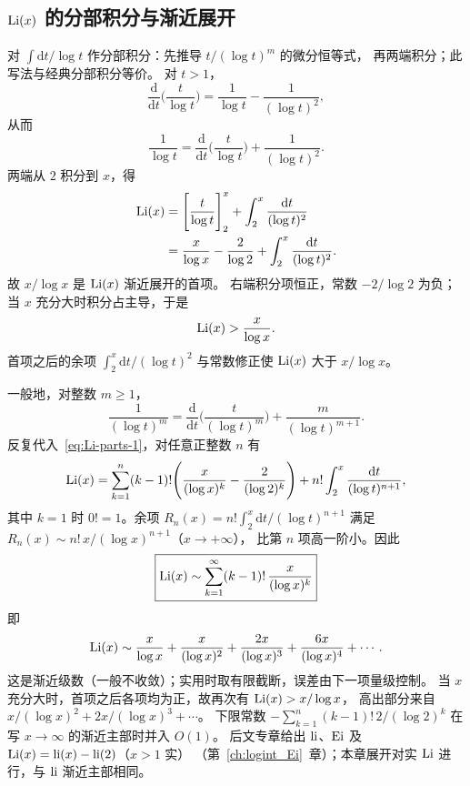 \subsection{\texorpdfstring{$\operatorname{Li}(x)$}{Li(x)} 的分部积分与渐近展开}
\label{sec:Li-integration-by-parts}

对 $\int\mathrm{d}t/\log t$ 作分部积分：先推导 $t/(\log t)^{m}$ 的微分恒等式，
再两端积分；此写法与经典分部积分等价。
对 $t>1$，
\[
  \frac{\mathrm{d}}{\mathrm{d}t}\Biggl(\frac{t}{\log t}\Biggr)
  =\frac{1}{\log t}-\frac{1}{(\log t)^{2}},
\]
从而
\[
  \frac{1}{\log t}
  =\frac{\mathrm{d}}{\mathrm{d}t}\Biggl(\frac{t}{\log t}\Biggr)
  +\frac{1}{(\log t)^{2}}.
\]
两端从 $2$ 积分到 $x$，得
\begin{align}
  \operatorname{Li}(x)
  &=\Biggl[\frac{t}{\log t}\Biggr]_{2}^{x}
  +\int_{2}^{x}\frac{\mathrm{d}t}{(\log t)^{2}}
  \nonumber\\
  &=\frac{x}{\log x}-\frac{2}{\log 2}
  +\int_{2}^{x}\frac{\mathrm{d}t}{(\log t)^{2}}.
  \label{eq:Li-parts-1}
\end{align}
故 $x/\log x$ 是 $\operatorname{Li}(x)$ 渐近展开的首项。
右端积分项恒正，常数 $-2/\log 2$ 为负；当 $x$ 充分大时积分占主导，于是
\[
  \operatorname{Li}(x) > \frac{x}{\log x}.
\]
首项之后的余项 $\int_2^x\mathrm{d}t/(\log t)^2$ 与常数修正使 $\operatorname{Li}(x)$ 大于 $x/\log x$。

一般地，对整数 $m\ge 1$，
\[
  \frac{1}{(\log t)^{m}}
  =\frac{\mathrm{d}}{\mathrm{d}t}\Biggl(\frac{t}{(\log t)^{m}}\Biggr)
  +\frac{m}{(\log t)^{m+1}}.
\]
反复代入~\eqref{eq:Li-parts-1}，对任意正整数 $n$ 有
\begin{equation}
  \operatorname{Li}(x)
  =\sum_{k=1}^{n}(k-1)!
  \Biggl(
    \frac{x}{(\log x)^{k}}-\frac{2}{(\log 2)^{k}}
  \Biggr)
  +n!\int_{2}^{x}\frac{\mathrm{d}t}{(\log t)^{n+1}},
  \label{eq:Li-parts-finite}
\end{equation}
其中 $k=1$ 时 $0!=1$。余项
$R_n(x)=n!\int_2^x\mathrm{d}t/(\log t)^{n+1}$
满足 $R_n(x)\sim n!\,x/(\log x)^{n+1}$（$x\to+\infty$），
比第 $n$ 项高一阶小。因此
\begin{equation}
  \boxed{
  \operatorname{Li}(x)
  \sim
  \sum_{k=1}^{\infty}(k-1)!\,\frac{x}{(\log x)^{k}}
  }
  \label{eq:Li-asymptotic}
\end{equation}
即
\[
  \operatorname{Li}(x)
  \sim
  \frac{x}{\log x}
  +\frac{x}{(\log x)^{2}}
  +\frac{2x}{(\log x)^{3}}
  +\frac{6x}{(\log x)^{4}}
  +\cdots.
\]
这是渐近级数（一般不收敛）；实用时取有限截断，误差由下一项量级控制。
当 $x$ 充分大时，首项之后各项均为正，故再次有 $\operatorname{Li}(x)>x/\log x$，
高出部分来自 $x/(\log x)^2+2x/(\log x)^3+\cdots$。
下限常数 $-\sum_{k=1}^{n}(k-1)!\,2/(\log 2)^{k}$ 在写 $x\to\infty$ 的渐近主部时并入 $O(1)$。
后文专章给出 $\operatorname{li}$、$\operatorname{Ei}$ 及 $\operatorname{Li}(x)=\operatorname{li}(x)-\operatorname{li}(2)$（$x>1$ 实）
（第~\ref{ch:logint_Ei}~章）；本章展开对实 $\operatorname{Li}$ 进行，与 $\operatorname{li}$ 渐近主部相同。

